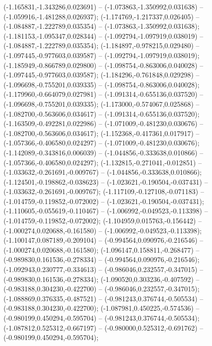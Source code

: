  (-1.165831,-1.343286,0.023691) -- (-1.073863,-1.350992,0.031638) -- (-1.059916,-1.481288,0.026937);
 (-1.174769,-1.217337,0.026405) -- (-1.084887,-1.222789,0.035354) -- (-1.073863,-1.350992,0.031638);
 (-1.181153,-1.095347,0.028344) -- (-1.092794,-1.097919,0.038019) -- (-1.084887,-1.222789,0.035354);
 (-1.184897,-0.978215,0.029480) -- (-1.097445,-0.977603,0.039587) -- (-1.092794,-1.097919,0.038019);
 (-1.185949,-0.866789,0.029800) -- (-1.098754,-0.863006,0.040028) -- (-1.097445,-0.977603,0.039587);
 (-1.184296,-0.761848,0.029298) -- (-1.096698,-0.755201,0.039335) -- (-1.098754,-0.863006,0.040028);
 (-1.179960,-0.664079,0.027981) -- (-1.091314,-0.655136,0.037520) -- (-1.096698,-0.755201,0.039335);
 (-1.173000,-0.574067,0.025868) -- (-1.082700,-0.563606,0.034617) -- (-1.091314,-0.655136,0.037520);
 (-1.163509,-0.492281,0.022986) -- (-1.071009,-0.481230,0.030676) -- (-1.082700,-0.563606,0.034617);
 (-1.152368,-0.417361,0.017917) -- (-1.057366,-0.406580,0.024297) -- (-1.071009,-0.481230,0.030676);
 (-1.142089,-0.343816,0.006039) -- (-1.044856,-0.333638,0.010866) -- (-1.057366,-0.406580,0.024297);
 (-1.132815,-0.271041,-0.012851) -- (-1.033632,-0.261691,-0.009767) -- (-1.044856,-0.333638,0.010866);
 (-1.124501,-0.198862,-0.038623) -- (-1.023621,-0.190504,-0.037431) -- (-1.033632,-0.261691,-0.009767);
 (-1.117109,-0.127108,-0.071183) -- (-1.014759,-0.119852,-0.072002) -- (-1.023621,-0.190504,-0.037431);
 (-1.110605,-0.055619,-0.110467) -- (-1.006992,-0.049523,-0.113398) -- (-1.014759,-0.119852,-0.072002);
 (-1.104959,0.015763,-0.156442) -- (-1.000274,0.020688,-0.161580) -- (-1.006992,-0.049523,-0.113398);
 (-1.100147,0.087189,-0.209104) -- (-0.994564,0.090976,-0.216546) -- (-1.000274,0.020688,-0.161580);
 (-1.096147,0.158811,-0.268477) -- (-0.989830,0.161536,-0.278334) -- (-0.994564,0.090976,-0.216546);
 (-1.092943,0.230777,-0.334613) -- (-0.986046,0.232557,-0.347015) -- (-0.989830,0.161536,-0.278334);
 (-1.090520,0.303236,-0.407592) -- (-0.983188,0.304230,-0.422700) -- (-0.986046,0.232557,-0.347015);
 (-1.088869,0.376335,-0.487521) -- (-0.981243,0.376744,-0.505534) -- (-0.983188,0.304230,-0.422700);
 (-1.087981,0.450225,-0.574536) -- (-0.980199,0.450294,-0.595704) -- (-0.981243,0.376744,-0.505534);
 (-1.087812,0.525312,-0.667197) -- (-0.980000,0.525312,-0.691762) -- (-0.980199,0.450294,-0.595704);
